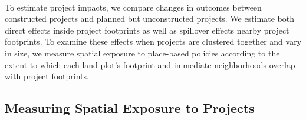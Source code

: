 \documentclass[12pt]{article}
\begin{document}
\begin{figure}[hbtp]
\begin{subfigure}[b]{.8\textwidth}

        \label{fig:outsideproj}
    \end{subfigure}\\
\end{figure} 





To estimate project impacts, we compare changes in outcomes between constructed projects and planned but unconstructed projects.  We estimate both direct effects inside project footprints as well as spillover effects nearby project footprints.  To examine these effects when projects are clustered together and vary in size, we measure spatial exposure to place-based policies according to the extent to which each land plot's footprint and immediate neighborhoods overlap with project footprints.

\subsection{Measuring Spatial Exposure to Projects}\label{section:exposuremeasure}
\end{document}
